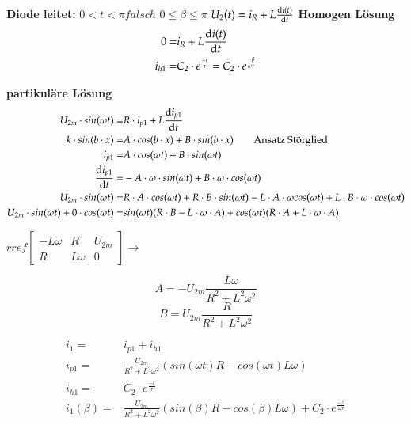 \textbf{Diode leitet:} $ 0 < t < \pi falsch $ $ 0 \leq \beta \leq \pi $\newline
$U_2(t) = i_R + L\frac{\mathop{}\!\mathrm{d} i(t)}{\mathop{}\!\mathrm{d} t}$\newline
\textbf{Homogen Lösung}
\begin{align*}
     0 = & i_R + L \frac{\mathop{}\!\mathrm{d} i(t)}{\mathop{}\!\mathrm{d} t} \\
     i_{h1} = & C_2 \cdot e^{\frac{-t}{\tau}} = C_2 \cdot e^{\frac{-\beta}{\omega \tau}}
\end{align*} 

\textbf{partikuläre Lösung}
\begin{align*}
    U_{2m}\cdot sin(\omega t) = & R\cdot i_{p1} + L \frac{\mathop{}\!\mathrm{d} i_{p1}}{\mathop{}\!\mathrm{d} t}\\
    k \cdot sin(b \cdot x)= & A \cdot cos(b \cdot x) + B \cdot sin(b \cdot x) \qquad \text{Ansatz Störglied}\\
    i_{p1} = & A \cdot cos(\omega t) + B \cdot sin(\omega t)\\
    \frac{\mathop{}\!\mathrm{d} i_{p1}}{\mathop{}\!\mathrm{d} t} = & - A \cdot \omega \cdot sin(\omega t) + B \cdot \omega \cdot cos(\omega t)\\
    U_{2m}\cdot sin(\omega t) = & R\cdot A \cdot cos(\omega t) + R\cdot B \cdot sin(\omega t)  - L\cdot A \cdot \omega cos(\omega t) + L\cdot B \cdot \omega \cdot cos(\omega t)\\
    U_{2m}\cdot sin(\omega t) + 0\cdot cos(\omega t) = & sin(\omega t)(R \cdot B - L \cdot \omega \cdot A) + cos(\omega t)(R\cdot A + L \cdot \omega \cdot  A)
\end{align*}
\begin{minipage}{5cm}
    $rref
    \begin{bmatrix}
    -L\omega       &R  & U_{2m} \\ 
    R&L\omega          & 0
    \end{bmatrix} 
    \rightarrow$ 
\end{minipage}
\begin{minipage}{5cm}
    \[ A = -U_{2m} \frac{L\omega}{R^2 + L^2\omega^2} \]
    \[ B = U_{2m} \frac{R}{R^2 + L^2\omega^2} \]
\end{minipage}
\begin{align*}
    i_1 = & i_{p1} + i_{h1}\\
    i_{p1} = & \frac{U_{2m}}{R^2 + L^2\omega^2}\left(sin(\omega t) R - cos(\omega t) L\omega\right)\\
    i_{h1} = & C_2 \cdot e^{\frac{-t}{\tau}}\\
    i_{1}(\beta) = & \frac{U_{2m}}{R^2 + L^2\omega^2}\left(sin(\beta) R - cos(\beta) L\omega\right) + C_2 \cdot e^{\frac{-\beta}{\omega \tau}}
\end{align*}

